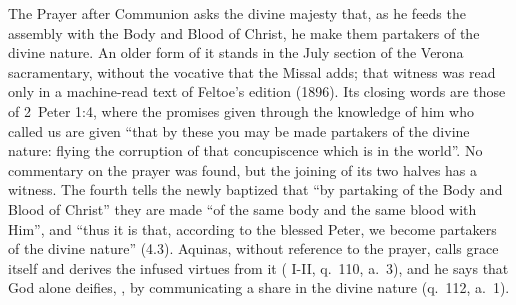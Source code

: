 The Prayer after Communion asks the divine majesty that, as he feeds the
assembly with the Body and Blood of Christ, he make them partakers of the
divine nature. An older form of it stands in the July section of the Verona
sacramentary, without the vocative  that the Missal adds; that
witness was read only in a machine-read text of Feltoe's edition (1896). Its
closing words are those of 2~Peter 1:4, where the promises given
through the knowledge of him who called us are given ``that by these you may
be made partakers of the divine nature: flying the corruption of that
concupiscence which is in the world''. No commentary on the prayer was found,
but the joining of its two halves has a witness. The fourth  tells the newly baptized that ``by partaking of the Body and Blood
of Christ'' they are made ``of the same body and the same blood with Him'', and
``thus it is that, according to the blessed Peter, we become partakers of the
divine nature'' (4.3). Aquinas, without reference to the prayer, calls grace
itself  and derives the infused virtues
from it ( I-II, q.~110, a.~3), and he says that God
alone deifies, , by
communicating a share in the divine nature (q.~112, a.~1).
